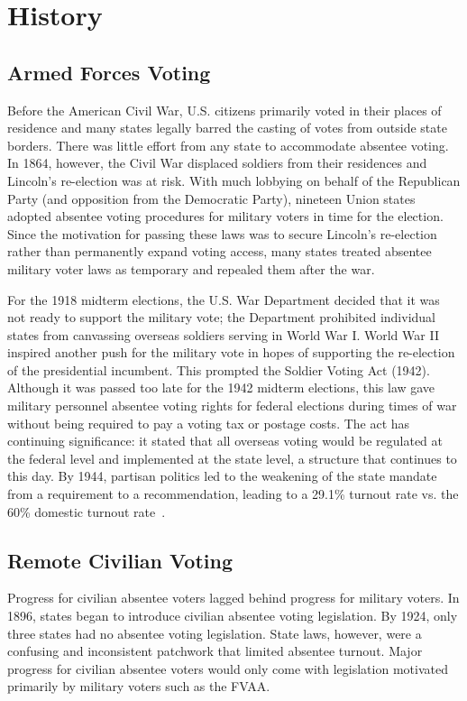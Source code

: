 \section{History}
\subsection{Armed Forces Voting}
Before the American Civil War, U.S. citizens primarily voted in their
places of residence and many states legally barred the casting of
votes from outside state borders. There was little effort from any
state to accommodate absentee voting. In 1864, however, the Civil War
displaced soldiers from their residences and Lincoln's re-election was
at risk. With much lobbying on behalf of the Republican Party (and
opposition from the Democratic Party), nineteen Union states adopted
absentee voting procedures for military voters in time for the
election. Since the motivation for passing these laws was to secure
Lincoln's re-election rather than permanently expand voting access,
many states treated absentee military voter laws as temporary and
repealed them after the war.

For the 1918 midterm elections, the U.S. War Department decided that
it was not ready to support the military vote; the Department
prohibited individual states from canvassing overseas soldiers serving
in World War I. World War II inspired another push for the military
vote in hopes of supporting the re-election of the presidential
incumbent. This prompted the Soldier Voting Act (1942).  Although it
was passed too late for the 1942 midterm elections, this law gave
military personnel absentee voting rights for federal elections during
times of war without being required to pay a voting tax or postage
costs. The act has continuing significance: it stated that all
overseas voting would be regulated at the federal level and
implemented at the state level, a structure that continues to this
day. By 1944, partisan politics led to the weakening of the state
mandate from a requirement to a recommendation, leading to a 29.1\%
turnout rate vs. the 60\% domestic turnout rate~\cite{smith2015}.

\subsection{Remote Civilian Voting}

Progress for civilian absentee voters lagged behind progress for
military voters. In 1896, states began to introduce civilian absentee
voting legislation. By 1924, only three states had no absentee voting
legislation. State laws, however, were a confusing and inconsistent
patchwork that limited absentee turnout. Major progress for civilian
absentee voters would only come with legislation motivated primarily
by military voters such as the FVAA.

